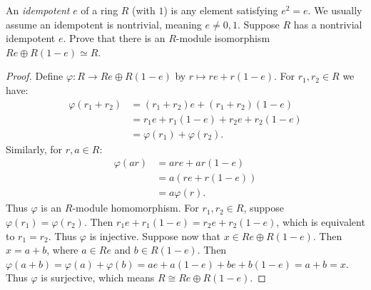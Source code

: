 \documentclass[10pt,oneside,openany]{memoir}
\begin{document}
\begin{exercise}
An \emph{idempotent} $e$ of a ring $R$ (with $1$) is any element satisfying
$e^2=e$. We usually assume an idempotent is nontrivial, meaning $e\ne 0,1$.
Suppose $R$ has a nontrivial idempotent $e$. Prove that there is an $R$-module
isomorphism $Re\oplus R(1-e)\simeq R$.
\end{exercise}
	{\color{blue} \begin{proof}
		Define $\varphi:R \rightarrow Re \oplus R(1-e)$ by $r \mapsto re + r(1-e)$. For $r_1,r_2 \in R$ we have:
		\begin{align*}
			\varphi(r_1 + r_2)
			&= (r_1 + r_2)e + (r_1 + r_2)(1-e) \\
			&= r_1e + r_1(1-e) + r_2e + r_2(1-e) \\
			&= \varphi(r_1) + \varphi(r_2).
		\end{align*}
		Similarly, for $r,a \in R$:
		\begin{align*}
			\varphi(ar)
			&= are + ar(1-e) \\
			&= a(re + r(1-e)) \\
			&= a\varphi(r).
		\end{align*}
		Thus $\varphi$ is an $R$-module homomorphism. For $r_1,r_2 \in R$, suppose $\varphi(r_1) = \varphi(r_2)$. Then $r_1e + r_1(1-e) = r_2e + r_2(1-e)$, which is equivalent to $r_1=r_2$. Thus $\varphi$ is injective. Suppose now that $x \in Re \oplus R(1-e)$. Then $x=a+b$, where $a \in Re$ and $b \in R(1-e)$. Then $\varphi(a+b) = \varphi(a) + \varphi(b) = ae + a(1-e) + be + b(1-e) = a+b = x$. Thus $\varphi$ is surjective, which means $R \cong Re \oplus R(1-e)$.

	\end{proof}}
\end{document}
